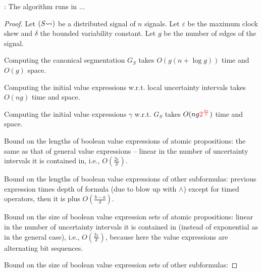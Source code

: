 \begin{claim}
	\TODO: The algorithm runs in ... %
\end{claim}
\begin{proof}
	\TODO %
	
	Let $(S {\rightsquigarrow})$ be a distributed signal of $n$ signals.
	Let $\varepsilon$ be the maximum clock skew and $\delta$ the bounded variability constant.
	Let $g$ be the number of edges of the signal.
	
	Computing the canonical segmentation $G_S$ takes $O(g (n + \log g))$ time and $O(g)$ space.
	
	Computing the initial value expressions w.r.t. local uncertainty intervals takes $O(n g)$ time and space.
	
	Computing the initial value expressions $\gamma$ w.r.t. $G_S$ takes $O(n g \textcolor{red}{2^{\frac{2\varepsilon}{\delta}}})$ time and space. 
	
	Bound on the lengths of boolean value expressions of atomic propositions: the same as that of general value expressions -- linear in the number of uncertainty intervals it is contained in, i.e., \alert{$O(\frac{2\varepsilon}{\delta})$}.
	
	Bound on the lengths of boolean value expressions of other subformulas: previous expression times depth of formula (due to blow up with $\land$) except for timed operators, then it is plus $O(\frac{b-a}{\delta})$.
	
	Bound on the size of boolean value expression sets of atomic propositions: linear in the number of uncertainty intervals it is contained in (instead of exponential as in the general case), i.e., \alert{$O(\frac{2\varepsilon}{\delta})$}, because here the value expressions are alternating bit sequences.
	
	Bound on the size of boolean value expression sets of other subformulas: 
	
	
\end{proof}